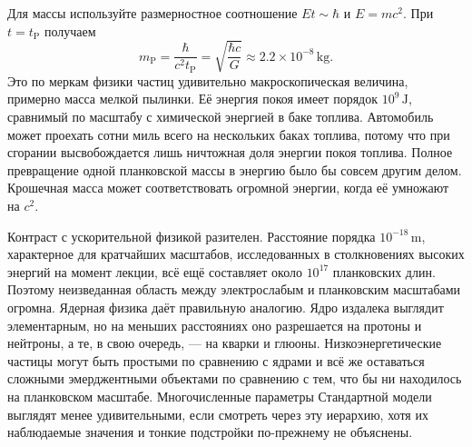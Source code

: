 Для массы используйте размерностное соотношение \(Et\sim\hbar\) и \(E=mc^2\). При \(t=t_{\mathrm P}\) получаем
\begin{equation}
m_{\mathrm P}
=\frac{\hbar}{c^2t_{\mathrm P}}
=\sqrt{\frac{\hbar c}{G}}
\approx 2.2\times10^{-8}\,\mathrm{kg}.
\label{eq:c10-planck-mass}
\end{equation}
Это по меркам физики частиц удивительно макроскопическая величина, примерно масса мелкой пылинки. Её энергия покоя имеет порядок \(10^9\,\mathrm J\), сравнимый по масштабу с химической энергией в баке топлива. Автомобиль может проехать сотни миль всего на нескольких баках топлива, потому что при сгорании высвобождается лишь ничтожная доля энергии покоя топлива. Полное превращение одной планковской массы в энергию было бы совсем другим делом. Крошечная масса может соответствовать огромной энергии, когда её умножают на \(c^2\).

Контраст с ускорительной физикой разителен. Расстояние порядка \(10^{-18}\,\mathrm m\), характерное для кратчайших масштабов, исследованных в столкновениях высоких энергий на момент лекции, всё ещё составляет около \(10^{17}\) планковских длин. Поэтому неизведанная область между электрослабым и планковским масштабами огромна. Ядерная физика даёт правильную аналогию. Ядро издалека выглядит элементарным, но на меньших расстояниях оно разрешается на протоны и нейтроны, а те, в свою очередь, — на кварки и глюоны. Низкоэнергетические частицы могут быть простыми по сравнению с ядрами и всё же оставаться сложными эмерджентными объектами по сравнению с тем, что бы ни находилось на планковском масштабе. Многочисленные параметры Стандартной модели выглядят менее удивительными, если смотреть через эту иерархию, хотя их наблюдаемые значения и тонкие подстройки по-прежнему не объяснены.

\begin{classroomqa}
\end{classroomqa}

